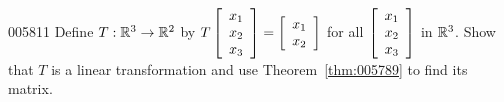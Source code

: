 \begin{example}{}{005811}
Define $T : \mathbb{R}^3 \to \mathbb{R}^2$ by $T \left[ \begin{array}{c}
x_{1} \\
x_{2} \\
x_{3}
\end{array} \right] = \left[ \begin{array}{c}
x_{1} \\
x_{2}
\end{array} \right]$
 for all $\left[ \begin{array}{c}
 x_{1} \\
 x_{2} \\
 x_{3}
 \end{array} \right]$
 in $\mathbb{R}^3$. Show that $T$ is a linear transformation and use Theorem~\ref{thm:005789} to find its matrix.


\end{example}
